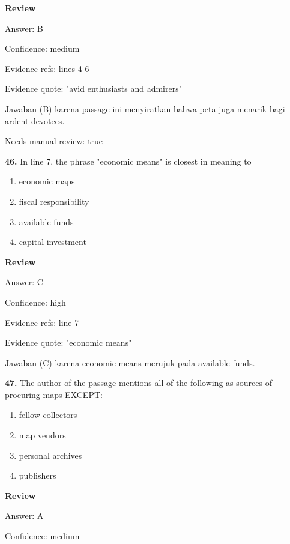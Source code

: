\documentclass[12pt]{article}
\begin{document}
\setlength{\parindent}{0pt}
\textbf{Review}\par
Answer: B\par
Confidence: medium\par
Evidence refs: lines 4-6\par
Evidence quote: "avid enthusiasts and admirers"\par
Jawaban (B) karena passage ini menyiratkan bahwa peta juga menarik bagi ardent devotees.\par
Needs manual review: true\par
\endgroup
\par
\vspace{0.25\baselineskip}
\noindent\textbf{46.} In line 7, the phrase "economic means" is closest in meaning to
\begin{enumerate}[label=(\Alph*),leftmargin=*,itemsep=0.2em]
\item economic maps
\item fiscal responsibility
\item available funds
\item capital investment
\end{enumerate}
\par
\begingroup
\setlength{\parskip}{0pt}
\setlength{\parindent}{0pt}
\textbf{Review}\par
Answer: C\par
Confidence: high\par
Evidence refs: line 7\par
Evidence quote: "economic means"\par
Jawaban (C) karena economic means merujuk pada available funds.\par
\endgroup
\par
\vspace{0.25\baselineskip}
\noindent\textbf{47.} The author of the passage mentions all of the following as sources of procuring maps EXCEPT:
\begin{enumerate}[label=(\Alph*),leftmargin=*,itemsep=0.2em]
\item fellow collectors
\item map vendors
\item personal archives
\item publishers
\end{enumerate}
\par
\begingroup
\setlength{\parskip}{0pt}
\setlength{\parindent}{0pt}
\textbf{Review}\par
Answer: A\par
Confidence: medium\par
\end{document}
